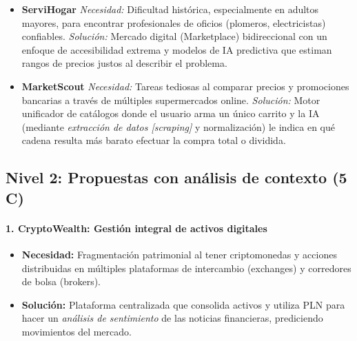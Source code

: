 \begin{itemize}
    \item \textbf{ServiHogar}
    \newline \textit{Necesidad:} Dificultad histórica, especialmente en adultos mayores, para encontrar profesionales de oficios (plomeros, electricistas) confiables.
    \newline \textit{Solución:} Mercado digital (Marketplace) bidireccional con un enfoque de accesibilidad extrema y modelos de IA predictiva que estiman rangos de precios justos al describir el problema.

    \item \textbf{MarketScout}
    \newline \textit{Necesidad:} Tareas tediosas al comparar precios y promociones bancarias a través de múltiples supermercados online.
    \newline \textit{Solución:} Motor unificador de catálogos donde el usuario arma un único carrito y la IA (mediante \textit{extracción de datos [scraping]} y normalización) le indica en qué cadena resulta más barato efectuar la compra total o dividida.
\end{itemize}

\newpage

\subsection{Nivel 2: Propuestas con análisis de contexto (5 C)}

\paragraph{1. CryptoWealth: Gestión integral de activos digitales}

\begin{itemize}
    \item \textbf{Necesidad:} Fragmentación patrimonial al tener criptomonedas y acciones distribuidas en múltiples plataformas de intercambio (exchanges) y corredores de bolsa (brokers).
    \item \textbf{Solución:} Plataforma centralizada que consolida activos y utiliza PLN para hacer un \textit{análisis de sentimiento} de las noticias financieras, prediciendo movimientos del mercado.
\end{itemize}

